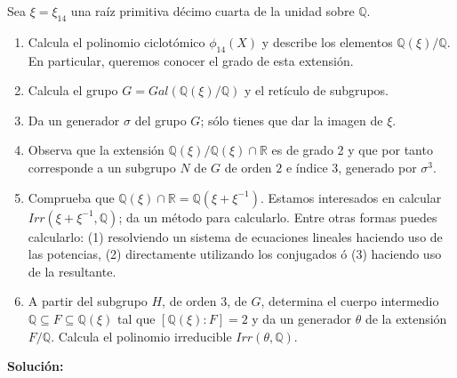 \begin{exercise}
Sea $\xi = \xi_{14}$ una raíz primitiva décimo cuarta de la unidad sobre $\mathbb{Q}$. 

\begin{enumerate}
\item Calcula el polinomio ciclotómico $\phi_{14}(X)$ y describe los elementos $\mathbb{Q}(\xi)/\mathbb{Q}$. En particular, queremos conocer el grado de esta extensión. 
\item Calcula el grupo $G = Gal(\mathbb{Q}(\xi)/\mathbb{Q})$ y el retículo de subgrupos. 
\item Da un generador $\sigma$ del grupo $G$; sólo tienes que dar la imagen de $\xi$. 
\item Observa que la extensión $\mathbb{Q}(\xi)/\mathbb{Q}(\xi) \cap \mathbb{R}$ es de grado 2 y que por tanto corresponde a un subgrupo $N$ de $G$ de orden $2$ e índice $3$, generado por $\sigma^3$. 
\item Comprueba que $\mathbb{Q}(\xi) \cap \mathbb{R} = \mathbb{Q}(\xi + \xi^{-1})$. Estamos interesados en calcular $Irr(\xi+\xi^{-1},\mathbb{Q})$; da un método para calcularlo. Entre otras formas puedes calcularlo: (1) resolviendo un sistema de ecuaciones lineales haciendo uso de las potencias, (2) directamente utilizando los conjugados ó (3) haciendo uso de la resultante.
\item A partir del subgrupo $H$, de orden 3, de $G$, determina el cuerpo intermedio $\mathbb{Q} \subseteq F \subseteq \mathbb{Q}(\xi)$ tal que $[\mathbb{Q}(\xi):F] = 2$ y da un generador $\theta$ de la extensión $F/\mathbb{Q}$. Calcula el polinomio irreducible $Irr(\theta,\mathbb{Q})$. 
\end{enumerate}
\end{exercise}

\textbf{Solución:}

